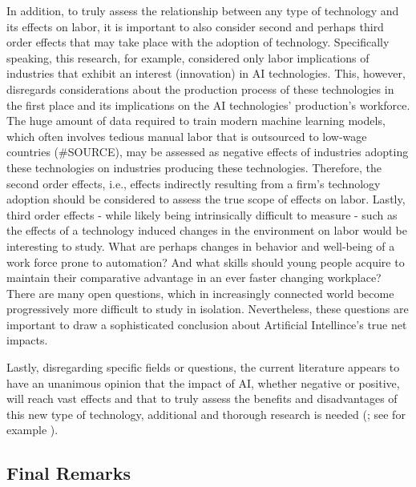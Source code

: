 \documentclass[
  12pt,
  a4paperpaper,
]{article}
\begin{document}
In addition, to truly assess the relationship between any type of
technology and its effects on labor, it is important to also consider
second and perhaps third order effects that may take place with the
adoption of technology. Specifically speaking, this research, for
example, considered only labor implications of industries that exhibit
an interest (innovation) in AI technologies. This, however, disregards
considerations about the production process of these technologies in the
first place and its implications on the AI technologies' production's
workforce. The huge amount of data required to train modern machine
learning models, which often involves tedious manual labor that is
outsourced to low-wage countries (\#SOURCE), may be assessed as negative
effects of industries adopting these technologies on industries
producing these technologies. Therefore, the second order effects, i.e.,
effects indirectly resulting from a firm's technology adoption should be
considered to assess the true scope of effects on labor. Lastly, third
order effects - while likely being intrinsically difficult to measure -
such as the effects of a technology induced changes in the environment
on labor would be interesting to study. What are perhaps changes in
behavior and well-being of a work force prone to automation? And what
skills should young people acquire to maintain their comparative
advantage in an ever faster changing workplace? There are many open
questions, which in increasingly connected world become progressively
more difficult to study in isolation. Nevertheless, these questions are
important to draw a sophisticated conclusion about Artificial
Intellince's true net impacts.

Lastly, disregarding specific fields or questions, the current
literature appears to have an unanimous opinion that the impact of AI,
whether negative or positive, will reach vast effects and that to truly
assess the benefits and disadvantages of this new type of technology,
additional and thorough research is needed
(; see for example ).

\subsection{Final Remarks}\label{final-remarks}
\end{document}
